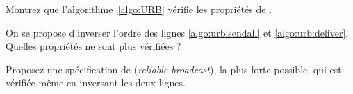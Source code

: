 \begin{exercice}
  \begin{algorithm}
    
    \caption{Uniform-reliable-broadcast (code for $p_i$)}
    \label{algo:URB}
  \end{algorithm}
  
  \begin{questions}
  \item Montrez que l'algorithme~\ref{algo:URB} vérifie les propriétés de . 
  \item On se propose d'inverser l'ordre des lignes \ref{algo:urb:sendall} et \ref{algo:urb:deliver}.
    Quelles propriétés ne sont plus vérifiées ? 
  \item Proposez une spécification de  (\emph{reliable broadcast}),
    la plus forte possible, qui est vérifiée même en inversant les deux lignes. 
  \end{questions}
\end{exercice}

\endgroup
\endinput
